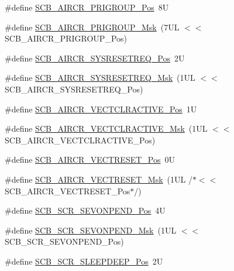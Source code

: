 \begin{DoxyCompactItemize}
\item 
\#define \hyperlink{group___c_m_s_i_s___s_c_b_gaca155deccdeca0f2c76b8100d24196c8}{S\+C\+B\+\_\+\+A\+I\+R\+C\+R\+\_\+\+P\+R\+I\+G\+R\+O\+U\+P\+\_\+\+Pos}~8U
\item 
\#define \hyperlink{group___c_m_s_i_s___s_c_b_ga8be60fff03f48d0d345868060dc6dae7}{S\+C\+B\+\_\+\+A\+I\+R\+C\+R\+\_\+\+P\+R\+I\+G\+R\+O\+U\+P\+\_\+\+Msk}~(7\+U\+L $<$$<$ S\+C\+B\+\_\+\+A\+I\+R\+C\+R\+\_\+\+P\+R\+I\+G\+R\+O\+U\+P\+\_\+\+Pos)
\item 
\#define \hyperlink{group___c_m_s_i_s___s_c_b_gaffb2737eca1eac0fc1c282a76a40953c}{S\+C\+B\+\_\+\+A\+I\+R\+C\+R\+\_\+\+S\+Y\+S\+R\+E\+S\+E\+T\+R\+E\+Q\+\_\+\+Pos}~2U
\item 
\#define \hyperlink{group___c_m_s_i_s___s_c_b_gaae1181119559a5bd36e62afa373fa720}{S\+C\+B\+\_\+\+A\+I\+R\+C\+R\+\_\+\+S\+Y\+S\+R\+E\+S\+E\+T\+R\+E\+Q\+\_\+\+Msk}~(1\+U\+L $<$$<$ S\+C\+B\+\_\+\+A\+I\+R\+C\+R\+\_\+\+S\+Y\+S\+R\+E\+S\+E\+T\+R\+E\+Q\+\_\+\+Pos)
\item 
\#define \hyperlink{group___c_m_s_i_s___s_c_b_gaa30a12e892bb696e61626d71359a9029}{S\+C\+B\+\_\+\+A\+I\+R\+C\+R\+\_\+\+V\+E\+C\+T\+C\+L\+R\+A\+C\+T\+I\+V\+E\+\_\+\+Pos}~1U
\item 
\#define \hyperlink{group___c_m_s_i_s___s_c_b_ga212c5ab1c1c82c807d30d2307aa8d218}{S\+C\+B\+\_\+\+A\+I\+R\+C\+R\+\_\+\+V\+E\+C\+T\+C\+L\+R\+A\+C\+T\+I\+V\+E\+\_\+\+Msk}~(1\+U\+L $<$$<$ S\+C\+B\+\_\+\+A\+I\+R\+C\+R\+\_\+\+V\+E\+C\+T\+C\+L\+R\+A\+C\+T\+I\+V\+E\+\_\+\+Pos)
\item 
\#define \hyperlink{group___c_m_s_i_s___s_c_b_ga0d483d9569cd9d1b46ec0d171b1f18d8}{S\+C\+B\+\_\+\+A\+I\+R\+C\+R\+\_\+\+V\+E\+C\+T\+R\+E\+S\+E\+T\+\_\+\+Pos}~0U
\item 
\#define \hyperlink{group___c_m_s_i_s___s_c_b_ga3006e31968bb9725e7b4ee0784d99f7f}{S\+C\+B\+\_\+\+A\+I\+R\+C\+R\+\_\+\+V\+E\+C\+T\+R\+E\+S\+E\+T\+\_\+\+Msk}~(1\+U\+L /$\ast$$<$$<$ S\+C\+B\+\_\+\+A\+I\+R\+C\+R\+\_\+\+V\+E\+C\+T\+R\+E\+S\+E\+T\+\_\+\+Pos$\ast$/)
\item 
\#define \hyperlink{group___c_m_s_i_s___s_c_b_ga3bddcec40aeaf3d3a998446100fa0e44}{S\+C\+B\+\_\+\+S\+C\+R\+\_\+\+S\+E\+V\+O\+N\+P\+E\+N\+D\+\_\+\+Pos}~4U
\item 
\#define \hyperlink{group___c_m_s_i_s___s_c_b_gafb98656644a14342e467505f69a997c9}{S\+C\+B\+\_\+\+S\+C\+R\+\_\+\+S\+E\+V\+O\+N\+P\+E\+N\+D\+\_\+\+Msk}~(1\+U\+L $<$$<$ S\+C\+B\+\_\+\+S\+C\+R\+\_\+\+S\+E\+V\+O\+N\+P\+E\+N\+D\+\_\+\+Pos)
\item 
\#define \hyperlink{group___c_m_s_i_s___s_c_b_gab304f6258ec03bd9a6e7a360515c3cfe}{S\+C\+B\+\_\+\+S\+C\+R\+\_\+\+S\+L\+E\+E\+P\+D\+E\+E\+P\+\_\+\+Pos}~2U

\end{DoxyCompactItemize}
